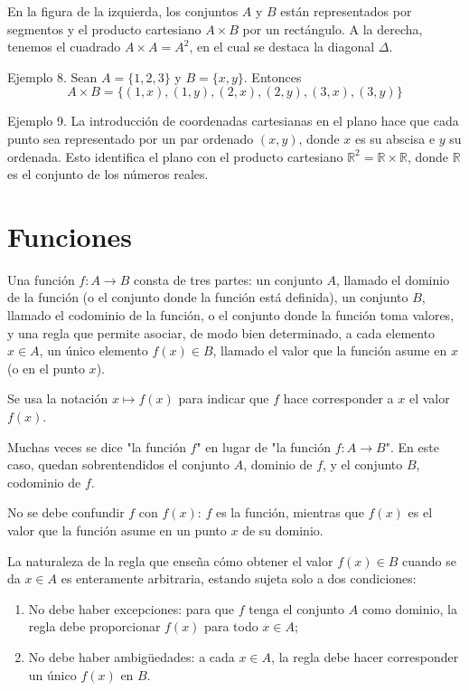 En la figura de la izquierda, los conjuntos \(A\) y \(B\) están representados por segmentos y el producto cartesiano \(A \times B\) por un rectángulo. A la derecha, tenemos el cuadrado \(A \times A = A^2\), en el cual se destaca la diagonal \(\Delta\).

Ejemplo 8. Sean \(A = \{1, 2, 3\}\) y \(B = \{x, y\}\). Entonces  
\[A \times B = \{(1, x), (1, y), (2, x), (2, y), (3, x), (3, y)\}\]

Ejemplo 9. La introducción de coordenadas cartesianas en el plano hace que cada punto sea representado por un par ordenado \((x, y)\), donde \(x\) es su abscisa e \(y\) su ordenada. Esto identifica el plano con el producto cartesiano \(\mathbb{R}^2 = \mathbb{R} \times \mathbb{R}\), donde \(\mathbb{R}\) es el conjunto de los números reales.

\section{Funciones}

Una función \(f: A \to B\) consta de tres partes: un conjunto \(A\), llamado el dominio de la función (o el conjunto donde la función está definida), un conjunto \(B\), llamado el codominio de la función, o el conjunto donde la función toma valores, y una regla que permite asociar, de modo bien determinado, a cada elemento \(x \in A\), un único elemento \(f(x) \in B\), llamado el valor que la función asume en \(x\) (o en el punto \(x\)).

Se usa la notación \(x \mapsto f(x)\) para indicar que \(f\) hace corresponder a \(x\) el valor \(f(x)\).

Muchas veces se dice "la función \(f\)" en lugar de "la función \(f: A \to B\)". En este caso, quedan sobrentendidos el conjunto \(A\), dominio de \(f\), y el conjunto \(B\), codominio de \(f\).

No se debe confundir \(f\) con \(f(x)\): \(f\) es la función, mientras que \(f(x)\) es el valor que la función asume en un punto \(x\) de su dominio.

La naturaleza de la regla que enseña cómo obtener el valor \(f(x) \in B\) cuando se da \(x \in A\) es enteramente arbitraria, estando sujeta solo a dos condiciones:

\begin{enumerate}
\item No debe haber excepciones: para que \(f\) tenga el conjunto \(A\) como dominio, la regla debe proporcionar \(f(x)\) para todo \(x \in A\);

\item No debe haber ambigüedades: a cada \(x \in A\), la regla debe hacer corresponder un único \(f(x)\) en \(B\).
\end{enumerate}

